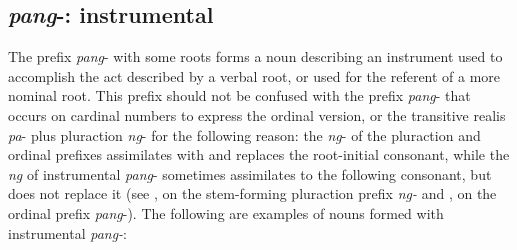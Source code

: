 \subsection{\textit{pang}-: instrumental}
\label{sec:pang}

The prefix \textit{pang}{}- with some roots forms a noun describing an instrument used to accomplish the act described by a verbal root, or used for the referent of a more nominal root. This prefix should not be confused with the prefix \textit{pang}- that occurs on cardinal numbers to express the ordinal version, or the transitive realis \textit{pa}{}- plus pluraction \textit{ng}{}- for the following reason: the \textit{ng}{}- of the pluraction and ordinal prefixes assimilates with and replaces the root-initial consonant, while the \textit{ng} of instrumental \textit{pang}{}- sometimes assimilates to the following consonant, but does not replace it (see ,  on the stem-forming pluraction prefix \textit{ng-} and ,  on the ordinal prefix \textit{pang}-). The following are examples of nouns formed with instrumental \textit{pang-}:

